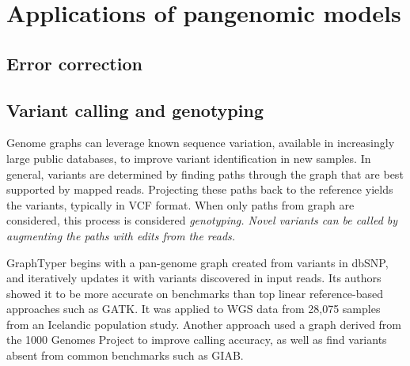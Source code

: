 \section{Applications of pangenomic models}

\subsection{Error correction}

\subsection{Variant calling and genotyping}

Genome graphs can leverage known sequence variation, available in increasingly large public databases, to improve variant identification in new samples.
In general, variants are determined by finding paths through the graph that are best supported by mapped reads.
Projecting these paths back to the reference yields the variants, typically in VCF format.
When only paths from graph are considered, this process is considered \it{genotyping}.
Novel variants can be \it{called} by augmenting the paths with edits from the reads.

GraphTyper \cite{eggertsson2017graphtyper} begins with a pan-genome graph created from variants in dbSNP, and iteratively updates it with variants discovered in input reads.
Its authors showed it to be more accurate on benchmarks than top linear reference-based approaches such as GATK.
It was applied to WGS data from 28,075 samples from an Icelandic population study.
Another approach used a graph derived from the 1000 Genomes Project \cite{Rakocevic_2019} to improve calling accuracy, as well as find variants absent from common benchmarks such as GIAB.

